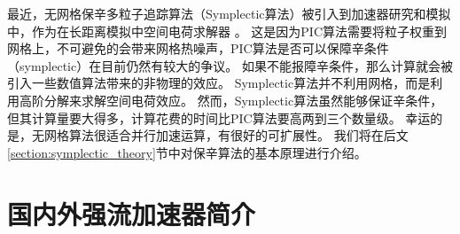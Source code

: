 最近，无网格保辛多粒子追踪算法（Symplectic算法）被引入到加速器研究和模拟中，作为在长距离模拟中空间电荷求解器 \cite{symplectic_ji2017}。
这是因为PIC算法需要将粒子权重到网格上，不可避免的会带来网格热噪声，PIC算法是否可以保障辛条件（symplectic）在目前仍然有较大的争议。
如果不能报障辛条件，那么计算就会被引入一些数值算法带来的非物理的效应。
Symplectic算法并不利用网格，而是利用高阶分解来求解空间电荷效应。
然而，Symplectic算法虽然能够保证辛条件，但其计算量要大得多，计算花费的时间比PIC算法要高两到三个数量级。
幸运的是，无网格算法很适合并行加速运算，有很好的可扩展性。
我们将在后文\ref{section:symplectic_theory}节中对保辛算法的基本原理进行介绍。

\section{国内外强流加速器简介}